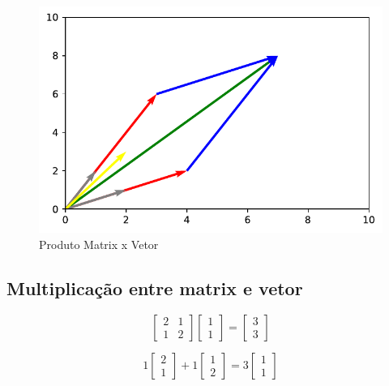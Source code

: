 \documentclass[
  letterpaper,
  DIV=11,
  numbers=noendperiod]{scrartcl}
\begin{document}
\begin{figure}[H]

{\centering \includegraphics{Aula04_files/figure-pdf/fig1-output-1.pdf}

}

\caption{Produto Matrix x Vetor}

\end{figure}

\hypertarget{multiplicauxe7uxe3o-entre-matrix-e-vetor-1}{%
\subsection{Multiplicação entre matrix e
vetor}\label{multiplicauxe7uxe3o-entre-matrix-e-vetor-1}}

\[ \begin{bmatrix}2 & 1\\ 1 & 2\end{bmatrix}\begin{bmatrix}1\\1\end{bmatrix}=\begin{bmatrix}3\\3\end{bmatrix}\]

\[ 1\begin{bmatrix}2 \\ 1\end{bmatrix} + 1\begin{bmatrix}1 \\ 2\end{bmatrix}=3\begin{bmatrix}1\\1\end{bmatrix}\]
\end{document}
